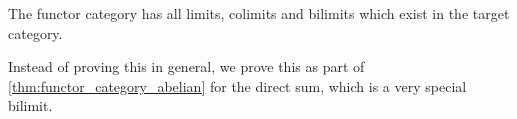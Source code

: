 

\begin{theorem}
The functor category has all limits, colimits and bilimits which exist in the target category.
\end{theorem}

Instead of proving this in general, we prove this as part of \ref{thm:functor_category_abelian} for the direct sum, which is a very special bilimit.

